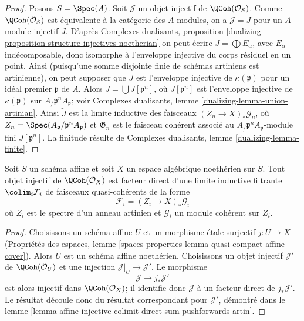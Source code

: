 \begin{proof}
Posons $S = \Spec(A)$. Soit $\mathcal{J}$ un objet injectif de
$\QCoh(\mathcal{O}_S)$. Comme $\QCoh(\mathcal{O}_S)$ est
\'equivalente \`a la cat\'egorie des $A$-modules, on a
$\mathcal{J}=\widetilde{J}$ pour un $A$-module injectif $J$.
D'apr\`es Complexes dualisants, proposition
\ref{dualizing-proposition-structure-injectives-noetherian}
on peut \'ecrire $J = \bigoplus E_\alpha$, avec $E_\alpha$ ind\'ecomposable,
donc isomorphe \`a l'enveloppe injective du corps r\'esiduel en un point.
Ainsi (puisqu'une somme disjointe finie de sch\'emas artiniens est
artinienne), on peut supposer que $J$ est l'enveloppe injective de
$\kappa(\mathfrak p)$ pour un id\'eal premier $\mathfrak p$ de $A$.
Alors $J = \bigcup J[\mathfrak p^n]$, o\`u $J[\mathfrak p^n]$ est
l'enveloppe injective de $\kappa(\mathfrak p)$ sur
$A_\mathfrak/\mathfrak p^nA_\mathfrak p$; voir
Complexes dualisants, lemme \ref{dualizing-lemma-union-artinian}.
Ainsi $\widetilde{J}$ est la limite inductive des faisceaux
$(Z_n \to X)_*\mathcal{G}_n$, o\`u
$Z_n = \Spec(A_\mathfrak p/\mathfrak p^nA_\mathfrak p)$ et
$\mathfrak G_n$ est le faisceau coh\'erent associ\'e au
$A_\mathfrak/\mathfrak p^nA_\mathfrak p$-module fini
$J[\mathfrak p^n]$. La finitude r\'esulte de
Complexes dualisants, lemme \ref{dualizing-lemma-finite}.
\end{proof}

\begin{lemma}
\label{lemma-injective-colimit-direct-sum-pushforwards-artin}
Soit $S$ un sch\'ema affine et soit $X$ un espace alg\'ebrique noeth\'erien
sur $S$. Tout objet injectif de $\QCoh(\mathcal{O}_X)$ est facteur direct
d'une limite inductive filtrante $\colim_i \mathcal{F}_i$ de faisceaux
quasi-coh\'erents de la forme
$$
\mathcal{F}_i = (Z_i \to X)_*\mathcal{G}_i
$$
o\`u $Z_i$ est le spectre d'un anneau artinien et $\mathcal{G}_i$ un module
coh\'erent sur $Z_i$.
\end{lemma}

\begin{proof}
Choisissons un sch\'ema affine $U$ et un morphisme \'etale surjectif
$j : U \to X$ (Propri\'et\'es des espaces, lemme
\ref{spaces-properties-lemma-quasi-compact-affine-cover}).
Alors $U$ est un sch\'ema affine noeth\'erien. Choisissons un objet injectif
$\mathcal{J}'$ de $\QCoh(\mathcal{O}_U)$ et une injection
$\mathcal{J}|_U \to \mathcal{J}'$. Le morphisme
$$
\mathcal{J} \to j_*\mathcal{J}'
$$
est alors injectif dans $\QCoh(\mathcal{O}_X)$; il identifie donc
$\mathcal{J}$ \`a un facteur direct de $j_*\mathcal{J}'$.
Le r\'esultat d\'ecoule donc du r\'esultat correspondant pour
$\mathcal{J}'$, d\'emontr\'e dans le lemme
\ref{lemma-affine-injective-colimit-direct-sum-pushforwards-artin}.
\end{proof}

